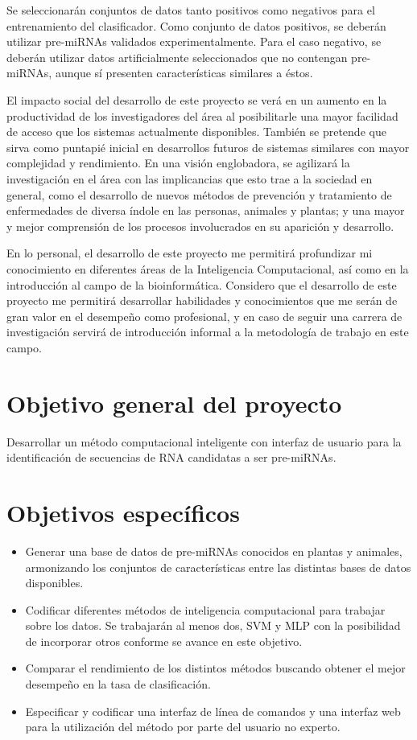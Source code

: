 \documentclass[12pt,bibliography=oldstyle,DIV=12,parskip=full-,titlepage]{scrartcl}
\begin{document}
Se seleccionarán conjuntos de datos tanto positivos como negativos
para el entrenamiento del clasificador. Como conjunto de datos
positivos, se deberán utilizar pre-miRNAs validados experimentalmente.
Para el caso negativo, se deberán utilizar datos artificialmente
seleccionados que no contengan pre-miRNAs, aunque sí presenten
características similares a éstos.

El impacto social del desarrollo de este proyecto se verá en un
aumento en la productividad de los investigadores del área al
posibilitarle una mayor facilidad de acceso que los sistemas actualmente
disponibles. También se pretende que sirva como puntapié inicial en
desarrollos futuros de sistemas similares con mayor complejidad y
rendimiento. En una visión englobadora, se agilizará la investigación
en el área con las implicancias que esto trae a la sociedad en
general, como el desarrollo de nuevos métodos de prevención y
tratamiento de enfermedades de diversa índole en las personas,
animales y plantas; y una mayor y mejor comprensión de los procesos
involucrados en su aparición y desarrollo.

En lo personal, el desarrollo de este proyecto me permitirá
profundizar mi conocimiento en diferentes áreas de la Inteligencia
Computacional, así como en la introducción al campo de la
bioinformática. Considero que el desarrollo de este proyecto me
permitirá desarrollar habilidades y conocimientos que me serán de gran
valor en el desempeño como profesional, y en caso de seguir una
carrera de investigación servirá de introducción informal a la
metodología de trabajo en este campo.
%
%
\newpage
\section{Objetivo general del proyecto}
Desarrollar un método computacional inteligente con interfaz de
usuario para la identificación de secuencias de RNA candidatas a ser
pre-miRNAs.
\section{Objetivos específicos}
\begin{itemize}
\item Generar una base de datos de pre-miRNAs conocidos en plantas y
  animales, armonizando los conjuntos de características entre las
  distintas bases de datos disponibles.
\item Codificar diferentes métodos de inteligencia computacional para
  trabajar sobre los datos. Se trabajarán al menos dos, SVM y MLP con
  la posibilidad de incorporar otros conforme se avance en este
  objetivo.
\item Comparar el rendimiento de los distintos métodos buscando
  obtener el mejor desempeño en la tasa de clasificación.
\item Especificar y codificar una interfaz de línea de comandos y una
  interfaz web para la utilización del método por parte del usuario no experto.
\end{itemize}
%
%
\end{document}
